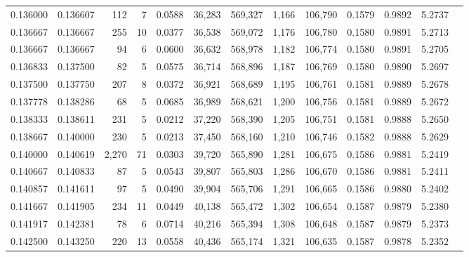 \begin{tabular}{rrrrrrrrrrrrr}
0.136000 & 0.136607 &   112 &   7 &                                     0.0588 &  36,283 & 569,327 &   1,166 & 106,790 & 0.1579 & 0.9892 & 5.2737 \\
0.136667 & 0.136667 &   255 &  10 &                                     0.0377 &  36,538 & 569,072 &   1,176 & 106,780 & 0.1580 & 0.9891 & 5.2713 \\
0.136667 & 0.136667 &    94 &   6 &                                     0.0600 &  36,632 & 568,978 &   1,182 & 106,774 & 0.1580 & 0.9891 & 5.2705 \\
0.136833 & 0.137500 &    82 &   5 &                                     0.0575 &  36,714 & 568,896 &   1,187 & 106,769 & 0.1580 & 0.9890 & 5.2697 \\
0.137500 & 0.137750 &   207 &   8 &                                     0.0372 &  36,921 & 568,689 &   1,195 & 106,761 & 0.1581 & 0.9889 & 5.2678 \\
0.137778 & 0.138286 &    68 &   5 &                                     0.0685 &  36,989 & 568,621 &   1,200 & 106,756 & 0.1581 & 0.9889 & 5.2672 \\
0.138333 & 0.138611 &   231 &   5 &                                     0.0212 &  37,220 & 568,390 &   1,205 & 106,751 & 0.1581 & 0.9888 & 5.2650 \\
0.138667 & 0.140000 &   230 &   5 &                                     0.0213 &  37,450 & 568,160 &   1,210 & 106,746 & 0.1582 & 0.9888 & 5.2629 \\
0.140000 & 0.140619 & 2,270 &  71 &                                     0.0303 &  39,720 & 565,890 &   1,281 & 106,675 & 0.1586 & 0.9881 & 5.2419 \\
0.140667 & 0.140833 &    87 &   5 &                                     0.0543 &  39,807 & 565,803 &   1,286 & 106,670 & 0.1586 & 0.9881 & 5.2411 \\
0.140857 & 0.141611 &    97 &   5 &                                     0.0490 &  39,904 & 565,706 &   1,291 & 106,665 & 0.1586 & 0.9880 & 5.2402 \\
0.141667 & 0.141905 &   234 &  11 &                                     0.0449 &  40,138 & 565,472 &   1,302 & 106,654 & 0.1587 & 0.9879 & 5.2380 \\
0.141917 & 0.142381 &    78 &   6 &                                     0.0714 &  40,216 & 565,394 &   1,308 & 106,648 & 0.1587 & 0.9879 & 5.2373 \\
0.142500 & 0.143250 &   220 &  13 &                                     0.0558 &  40,436 & 565,174 &   1,321 & 106,635 & 0.1587 & 0.9878 & 5.2352 \\

\end{tabular}
